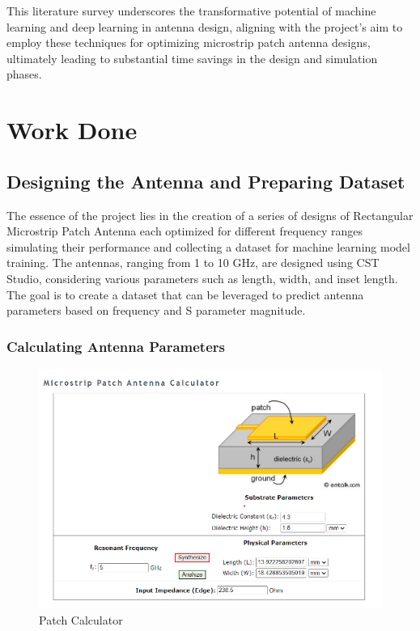 \documentclass[a4paper,12pt]{report}
\begin{document}
This literature survey underscores the transformative potential of machine learning and deep learning in antenna design, aligning with the project's aim to employ these techniques for optimizing microstrip patch antenna designs, ultimately leading to substantial time savings in the design and simulation phases.










\chapter{Work Done}
\label{chap:work_done}

\section{Designing the Antenna and Preparing Dataset}
\label{sec:designing_the_antenna}

The essence of the project lies in the creation of a series of designs of Rectangular Microstrip Patch Antenna each optimized for different frequency ranges simulating their performance and collecting a dataset for machine learning model training. The antennas, ranging from 1 to 10 GHz, are designed using CST Studio, considering various parameters such as length, width, and inset length. The goal is to create a dataset that can be leveraged to predict antenna parameters based on frequency and S parameter magnitude.

\subsection{Calculating Antenna Parameters}

\begin{figure}[H]
    \centering
    \includegraphics[width=.5\textwidth]{patchcalculator.png}
    \caption{Patch Calculator}
    \label{fig:patch_calculator}
\end{figure}
\end{document}
